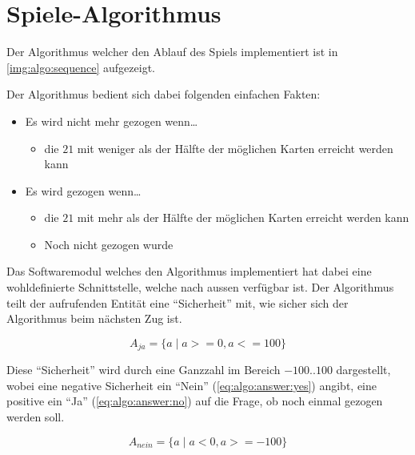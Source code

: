\chapter{Spiele-Algorithmus}

    Der Algorithmus welcher den Ablauf des Spiels implementiert ist in
    \autoref{img:algo:sequence} aufgezeigt.

    Der Algorithmus bedient sich dabei folgenden einfachen Fakten:

    \begin{itemize}
        \item Es wird nicht mehr gezogen wenn\dots
            \begin{itemize}
                \item die $21$ mit weniger als der Hälfte der möglichen Karten
                    erreicht werden kann
            \end{itemize}
        \item Es wird gezogen wenn\dots
            \begin{itemize}
                \item die $21$ mit mehr als der Hälfte der möglichen Karten
                    erreicht werden kann
                \item Noch nicht gezogen wurde
            \end{itemize}
    \end{itemize}

    Das Softwaremodul welches den Algorithmus implementiert hat dabei eine
    wohldefinierte Schnittstelle, welche nach aussen verfügbar ist.
    Der Algorithmus teilt der aufrufenden Entität eine ``Sicherheit'' mit,
    wie sicher sich der Algorithmus beim nächsten Zug ist.

    \begin{equation}
        \label{eq:algo:answer:yes}
        A_{ja} = \{ a \mid a >= 0, a <= 100 \}
    \end{equation}

    Diese ``Sicherheit'' wird durch eine Ganzzahl im Bereich $-100..100$
    dargestellt, wobei eine negative Sicherheit ein ``Nein''
    (\ref{eq:algo:answer:yes}) angibt, eine positive ein ``Ja''
    (\ref{eq:algo:answer:no}) auf die Frage, ob noch einmal gezogen werden soll.

    \begin{equation}
        \label{eq:algo:answer:no}
        A_{nein} = \{ a \mid a < 0, a >= -100 \}
    \end{equation}

